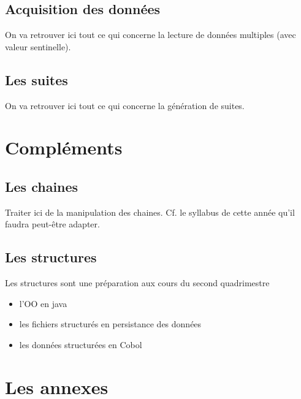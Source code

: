 \documentclass[a4paper,doubleside]{book}
\begin{document}
		\chapter{Acquisition des données}
			\begin{Note}
			On va retrouver ici tout ce qui concerne la lecture
			de données multiples (avec valeur sentinelle).
			\end{Note}
		\chapter{Les suites}
			\begin{Note}
			On va retrouver ici tout ce qui concerne la génération 
			de suites.
			\end{Note}
	
	\part{Compléments}
		\chapter{Les chaines}
			\begin{Note}
			Traiter ici de la manipulation des chaines.
			Cf. le syllabus de cette année
			qu'il faudra peut-être adapter.
			\end{Note}
		\chapter{Les structures}
			\begin{Note}
			Les structures sont une préparation aux cours
			du second quadrimestre
			\begin{itemize}
			\item l'OO en java
			\item les fichiers structurés en persistance des données
			\item les données structurées en Cobol
			\end{itemize}
			\end{Note}

	\appendix
	
	\part{Les annexes}
		
		
	
	
\end{document}
